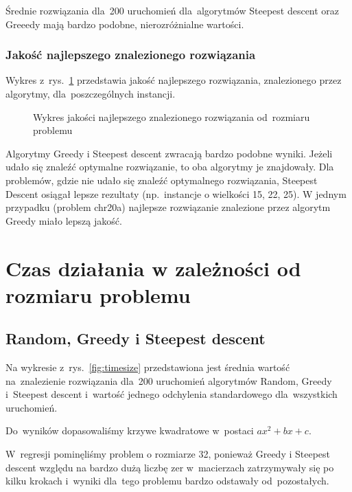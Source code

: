 \documentclass[a4paper,10pt]{article}
\begin{document}
Średnie rozwiązania dla~200 uruchomień dla~algorytmów Steepest descent oraz Greeedy mają bardzo podobne, nierozróżnialne wartości.

\subsubsection{Jakość najlepszego znalezionego rozwiązania}
Wykres z~rys.~\ref{fig:qualityvssizemax} przedstawia jakość najlepszego rozwiązania, znalezionego przez algorytmy, dla~poszczególnych instancji.

\begin{figure}[h!]
\begin{center}

\caption{Wykres jakości najlepszego znalezionego rozwiązania od~rozmiaru problemu}
\label{fig:qualityvssizemax}
\end{center}
\end{figure}

Algorytmy Greedy i Steepest descent zwracają bardzo podobne wyniki.
Jeżeli udało się znaleźć optymalne rozwiązanie, to oba algorytmy je znajdowały.
Dla problemów, gdzie nie udało się znaleźć optymalnego rozwiązania, Steepest Descent osiągał lepsze rezultaty (np.~instancje o wielkości 15, 22, 25).
W jednym przypadku (problem chr20a) najlepsze rozwiązanie znalezione przez algorytm Greedy miało lepszą jakość. 

\section{Czas działania w zależności od rozmiaru problemu}
\subsection{Random, Greedy i Steepest descent}
Na wykresie z~rys.~\ref{fig:timesize} przedstawiona jest średnia wartość na~znalezienie rozwiązania
dla~200 uruchomień algorytmów Random, Greedy i~Steepest descent
i~wartość jednego odchylenia standardowego dla~wszystkich uruchomień.

Do~wyników dopasowaliśmy krzywe kwadratowe w~postaci $ax^2+bx+c$.

W~regresji pominęliśmy problem o rozmiarze 32, ponieważ Greedy i Steepest descent względu na bardzo dużą liczbę zer
w~macierzach zatrzymywały się po kilku krokach i~wyniki dla~tego problemu bardzo odstawały od~pozostałych.

\end{document}
